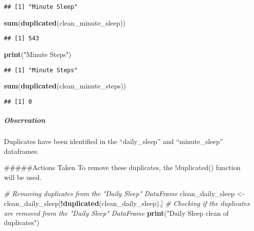 \documentclass[
]{article}
\newenvironment{Shaded}{\begin{snugshade}}{\end{snugshade}}
\newcommand{\CommentTok}[1]{\textcolor[rgb]{0.56,0.35,0.01}{\textit{#1}}}
\newcommand{\FunctionTok}[1]{\textcolor[rgb]{0.13,0.29,0.53}{\textbf{#1}}}
\newcommand{\NormalTok}[1]{#1}
\newcommand{\OtherTok}[1]{\textcolor[rgb]{0.56,0.35,0.01}{#1}}
\newcommand{\SpecialCharTok}[1]{\textcolor[rgb]{0.81,0.36,0.00}{\textbf{#1}}}
\newcommand{\StringTok}[1]{\textcolor[rgb]{0.31,0.60,0.02}{#1}}
\begin{document}
\begin{verbatim}
## [1] "Minute Sleep"
\end{verbatim}

\begin{Shaded}
\begin{Highlighting}[]
\FunctionTok{sum}\NormalTok{(}\FunctionTok{duplicated}\NormalTok{(clean\_minute\_sleep))}
\end{Highlighting}
\end{Shaded}

\begin{verbatim}
## [1] 543
\end{verbatim}

\begin{Shaded}
\begin{Highlighting}[]
\FunctionTok{print}\NormalTok{(}\StringTok{"Minute Steps"}\NormalTok{)}
\end{Highlighting}
\end{Shaded}

\begin{verbatim}
## [1] "Minute Steps"
\end{verbatim}

\begin{Shaded}
\begin{Highlighting}[]
\FunctionTok{sum}\NormalTok{(}\FunctionTok{duplicated}\NormalTok{(clean\_minute\_steps))}
\end{Highlighting}
\end{Shaded}

\begin{verbatim}
## [1] 0
\end{verbatim}

\hypertarget{observation-4}{%
\subparagraph{Observation}\label{observation-4}}

Duplicates have been identified in the ``daily\_sleep'' and
``minute\_sleep'' dataframes.

\#\#\#\#\#Actions Taken To remove these duplicates, the !duplicated()
function will be used.

\begin{Shaded}
\begin{Highlighting}[]
\CommentTok{\# Removing duplicates from the "Daily Sleep" DataFrame}
\NormalTok{clean\_daily\_sleep }\OtherTok{\textless{}{-}}\NormalTok{ clean\_daily\_sleep[}\SpecialCharTok{!}\FunctionTok{duplicated}\NormalTok{(clean\_daily\_sleep),]}
\CommentTok{\# Checking if the duplicates are removed from the "Daily Sleep" DataFrame}
\FunctionTok{print}\NormalTok{(}\StringTok{"Daily Sleep clean of duplicates"}\NormalTok{)}
\end{Highlighting}
\end{Shaded}
\end{document}
